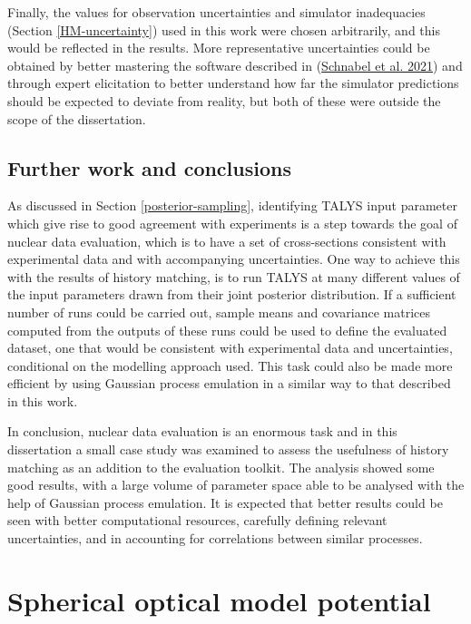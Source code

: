 \documentclass[
  12pt,
  a4paper,
  twoside]{book}
\begin{document}
Finally, the values for observation uncertainties and simulator inadequacies (Section \ref{HM-uncertainty}) used in this work were chosen arbitrarily, and this would be reflected in the results. More representative uncertainties could be obtained by better mastering the software described in (\protect\hyperlink{ref-Schnabel_2021}{Schnabel et al. 2021}) and through expert elicitation to better understand how far the simulator predictions should be expected to deviate from reality, but both of these were outside the scope of the dissertation.

\hypertarget{further-work-and-conclusions}{%
\section{Further work and conclusions}\label{further-work-and-conclusions}}

As discussed in Section \ref{posterior-sampling}, identifying TALYS input parameter which give rise to good agreement with experiments is a step towards the goal of nuclear data evaluation, which is to have a set of cross-sections consistent with experimental data and with accompanying uncertainties. One way to achieve this with the results of history matching, is to run TALYS at many different values of the input parameters drawn from their joint posterior distribution. If a sufficient number of runs could be carried out, sample means and covariance matrices computed from the outputs of these runs could be used to define the evaluated dataset, one that would be consistent with experimental data and uncertainties, conditional on the modelling approach used. This task could also be made more efficient by using Gaussian process emulation in a similar way to that described in this work.

In conclusion, nuclear data evaluation is an enormous task and in this dissertation a small case study was examined to assess the usefulness of history matching as an addition to the evaluation toolkit. The analysis showed some good results, with a large volume of parameter space able to be analysed with the help of Gaussian process emulation. It is expected that better results could be seen with better computational resources, carefully defining relevant uncertainties, and in accounting for correlations between similar processes.

\hypertarget{appendix-appendices}{%
\appendix}


\hypertarget{OMP-model-appendix}{%
\chapter{Spherical optical model potential}\label{OMP-model-appendix}}
\end{document}
